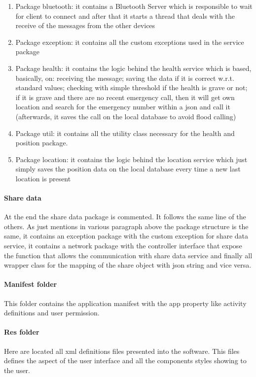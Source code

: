 \begin{enumerate}
\item Package bluetooth: it contains a Bluetooth Server which is responsible to wait for client to connect and after that it starts a thread that deals with the receive of the messages from the other devices
\item Package exception: it contains all the custom exceptions used in the service package
\item Package health: it contains the logic behind the health service which is based, basically, on: receiving the message; saving the data if it is correct w.r.t. standard values; checking with simple threshold if the health is grave or not; if it is grave and there are no recent emergency call, then it will get own location and search for the emergency number within a json and call it (afterwards, it saves the call on the local database to avoid flood calling)
\item Package util: it contains all the utility class necessary for the health and position package.
\item Package location: it contains the logic behind the location service which just simply saves the position data on the local database every time a new last location is present
\end{enumerate}

\paragraph{Share data}
At the end the share data package is commented. It follows the same line of the others. As just mentions in various paragraph above the package structure is the same, it contains an exception package with the custom exception for share data service, it contains a network package with the controller interface that expose the function that allows the communication with share data service and finally all wrapper class for the mapping of the share object with json string and vice versa.

\paragraph{Manifest folder}
This folder contains the application manifest with the app property like activity definitions and user permission. 

\paragraph{Res folder}
Here are located all xml definitions files presented into the software. This files defines the aspect of the user interface and all the components styles showing to the user.


